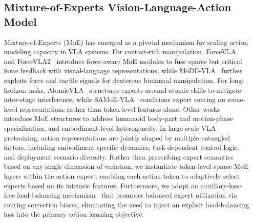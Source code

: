 \subsection{Mixture-of-Experts Vision-Language-Action Model}
Mixture-of-Experts (MoE) has emerged as a pivotal mechanism for scaling action modeling capacity in VLA systems.
For contact-rich manipulation, ForceVLA~\cite{forcevla} and ForceVLA2~\cite{forcevla2} introduce force-aware MoE modules to fuse sparse but critical force feedback with visual-language representations, while MoDE-VLA~\cite{modevla} further exploits force and tactile signals for dexterous bimanual manipulation. 
For long-horizon tasks, AtomicVLA~\cite{atomicvla} structures experts around atomic skills to mitigate inter-stage interference, while SAMoE-VLA~\cite{samoevla} conditions expert routing on scene-level representations rather than token-level features alone.
Other works~\cite{hex,himoevla, beingH05} introduce MoE structures to address humanoid body-part and motion-phase specialization, and embodiment-level heterogeneity.
In large-scale VLA pretraining, action representations are jointly shaped by multiple entangled factors, including embodiment-specific dynamics, task-dependent control logic, and deployment scenario diversity. Rather than prescribing expert semantics based on any single dimension of variation, we instantiate token-level sparse MoE layers within the action expert, enabling each action token to adaptively select experts based on its intrinsic features. Furthermore, we adopt an auxiliary-loss-free load-balancing mechanism~\cite{liu2024deepseek} that promotes balanced expert utilization via routing correction biases, eliminating the need to inject an explicit load-balancing loss into the primary action learning objective.












